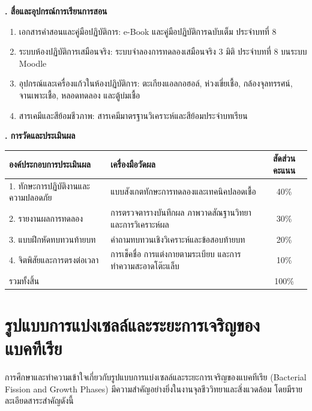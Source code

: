 \noindent\textbf{. สื่อและอุปกรณ์การเรียนการสอน}

\begin{enumerate}
    \item เอกสารคำสอนและคู่มือปฏิบัติการ: e-Book และคู่มือปฏิบัติการฉบับเต็ม ประจำบทที่ 8
    \item ระบบห้องปฏิบัติการเสมือนจริง: ระบบจำลองการทดลองเสมือนจริง 3 มิติ ประจำบทที่ 8 บนระบบ Moodle
    \item อุปกรณ์และเครื่องแก้วในห้องปฏิบัติการ: ตะเกียงแอลกอฮอล์, ห่วงเขี่ยเชื้อ, กล้องจุลทรรศน์, จานเพาะเชื้อ, หลอดทดลอง และตู้บ่มเชื้อ
    \item สารเคมีและสีย้อมชีวภาพ: สารเคมีมาตรฐานวิเคราะห์และสีย้อมประจำบทเรียน
\end{enumerate}

\noindent\textbf{. การวัดและประเมินผล}

\begin{table}[H]
\centering\small
\begin{tabularx}{\textwidth}{p{} p{} c}
\toprule
\textbf{องค์ประกอบการประเมินผล} & \textbf{เครื่องมือวัดผล} & \textbf{สัดส่วนคะแนน} \\
\midrule
1. ทักษะการปฏิบัติงานและความปลอดภัย & แบบสังเกตทักษะการทดลองและเทคนิคปลอดเชื้อ & 40\% \\
2. รายงานผลการทดลอง & การตรวจตารางบันทึกผล ภาพวาดสัณฐานวิทยา และการวิเคราะห์ผล & 30\% \\
3. แบบฝึกหัดทบทวนท้ายบท & คำถามทบทวนเชิงวิเคราะห์และข้อสอบท้ายบท & 20\% \\
4. จิตพิสัยและการตรงต่อเวลา & การเช็คชื่อ การแต่งกายตามระเบียบ และการทำความสะอาดโต๊ะแล็บ & 10\% \\
รวมทั้งสิ้น &  & 100\% \\
\bottomrule
\end{tabularx}
\end{table}

\newpage


\section{รูปแบบการแบ่งเซลล์และระยะการเจริญของแบคทีเรีย}

การศึกษาและทำความเข้าใจเกี่ยวกับรูปแบบการแบ่งเซลล์และระยะการเจริญของแบคทีเรีย (Bacterial Fission and Growth Phases) มีความสำคัญอย่างยิ่งในงานจุลชีววิทยาและสิ่งแวดล้อม โดยมีรายละเอียดสาระสำคัญดังนี้

